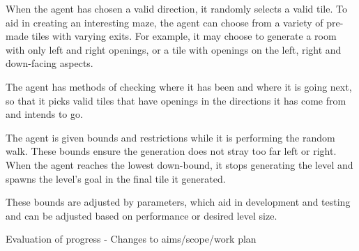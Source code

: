 \documentclass[progress]{cmpreport}
\begin{document}
When the agent has chosen a valid direction, it randomly selects a valid tile. To aid in creating an interesting maze, the agent can choose from a variety of pre-made tiles with varying exits. For example, it may choose to generate a room with only left and right openings, or a tile with openings on the left, right and down-facing aspects. 

The agent has methods of checking where it has been and where it is going next, so that it picks valid tiles that have openings in the directions it has come from and intends to go.

The agent is given bounds and restrictions while it is performing the random walk. These bounds ensure the generation does not stray too far left or right. When the agent reaches the lowest down-bound, it stops generating the level and spawns the level's goal in the final tile it generated.

These bounds are adjusted by parameters, which aid in development and testing and can be adjusted based on performance or desired level size.



\begin{section}{Evaluation of progress}
- Changes to aims/scope/work plan
\end{section}


\end{document}
